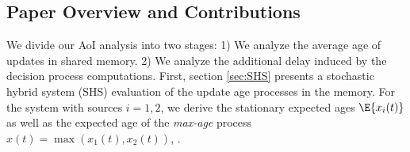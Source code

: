 \documentclass[conference, 10pt]{IEEEtran}
\newcommand{\maxage}{\hat{x}}
\newcommand{\dpage}{\hat{y}}
\newcommand{\monage}{\hat{z}}
\newcommand{\MOVE}[2][\mbox{}]{{\color{purple}MOVE: {\color{blue} #1}\ #2}\newline}
\begin{document}






\subsection{Paper Overview and Contributions} 
We 
divide our AoI analysis into two stages: 1) We analyze the average age of updates in shared memory.  2) We analyze the additional delay induced by the  decision process computations.  
First, section \ref{sec:SHS} presents a stochastic hybrid system (SHS) evaluation of  the update age processes in the memory. For the system with sources $i=1,2$, we derive the stationary expected ages $\E{x_i(t)}$ as well as the expected age of the {\em max-age} process $\maxage(t)=\max(x_1(t),x_2(t))$, . 
\end{document}
